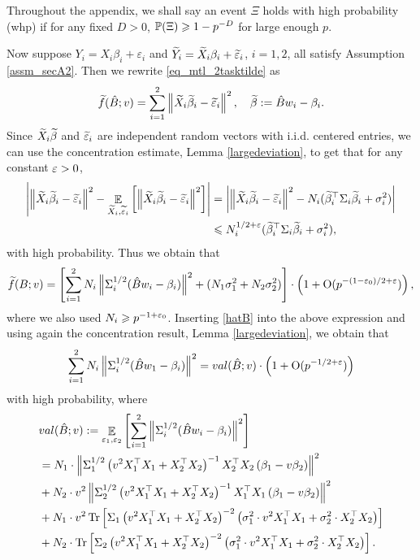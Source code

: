 Throughout the appendix, we shall say an event $\Xi$ holds with high probability (whp) if for any fixed $D>0$, $\P(\Xi)\ge 1- p^{-D}$ for large enough $p$.


Now suppose $Y_i = X_i\beta_i + \varepsilon_i$ and $\wt Y_i = \wt X_i\beta_i + \wt\varepsilon_i$, $i=1,2$, all satisfy Assumption \ref{assm_secA2}. Then we rewrite \eqref{eq_mtl_2tasktilde} as
$$	\wt f(\hat B; v) = \sum_{i=1}^2\left\| \wt X_i\wt\beta_i  - \wt \e_i\right\|^2 , \quad \wt\beta:=\hat B w_i-\beta_i.$$
Since $ \wt X_i\wt\beta$ and $ \wt \e_i$ are independent random vectors with i.i.d. centered entries, we can use the concentration estimate, Lemma \ref{largedeviation}, to get that for any constant $\e>0$,
\begin{align*}
\left|\left\| \wt X_i\wt\beta_i  - \wt \e_i\right\|^2 -  \exarg{\wt X_i,\wt{\e}_i} {\left\| \wt X_i\wt\beta_i  - \wt \e_i\right\|^2} \right| & =\left|\left\| \wt X_i\wt\beta_i  - \wt \e_i\right\|^2 - N_i (\wt\beta_i^\top \Sigma_i \wt\beta_i + \sigma_i^2) \right| \\
&\le N_i^{1/2+\e} (\wt\beta_i^\top \Sigma_i \wt\beta_i + \sigma_i^2),
\end{align*}
with high probability. Thus we obtain that 
$$\wt f(B; v)= \left[\sum_{i=1}^2 N_i\left\|\Sigma_i^{1/2}( \hat B w_i - \beta_i) \right\|^2 + (N_1\sigma^2_1+N_2\sigma^2_2)\right]\cdot \left( 1+\OO(p^{-(1-\e_0)/2+\e})\right),$$
where we also used $N_i\ge p^{-1+\e_0}$. Inserting \eqref{hatB} into the above expression and using 
 again the concentration result, Lemma \ref{largedeviation}, we obtain that
$$ \sum_{i=1}^2 N_i\left\|\Sigma_i^{1/2}( \hat B w_1 - \beta_i) \right\|^2 = \val(\hat B; v)\cdot \left( 1+\OO(p^{-1/2+\e})\right)$$
with high probability, where
\begin{align*}
		&\val(\hat{B}; v):= \exarg{\varepsilon_1,\e_2} {\sum_{i=1}^2 \left\|\Sigma_i^{1/2}( \hat B w_i - \beta_i) \right\|^2} \\
	&=  N_1 \cdot \bignorm{\Sigma_1^{1/2}\left(v^2 X_1^{\top}X_1 + X_2^{\top}X_2\right)^{-1}X_2^{\top}X_2\left (\beta_1 - v\beta_2\right)}^2 \nonumber \\
	&+ N_2 \cdot v^2\bignorm{\Sigma_2^{1/2}\left(v^2 X_1^{\top}X_1 + X_2^{\top}X_2\right)^{-1}X_1^{\top}X_1\left(\beta_1 - v\beta_2\right)}^2 \nonumber \\
		&+ N_1   \cdot v^2 \bigtr{\Sigma_1\left(v^2 X_1^{\top}X_1 + X_2^{\top}X_2\right)^{-2} \left(\sigma_1^2 \cdot v^2X_1^{\top}X_1 + \sigma_2^2 \cdot X_2^{\top}X_2\right)} \nonumber \\		
		&+ N_2  \cdot \bigtr{\Sigma_2\left(v^2 X_1^{\top}X_1 + X_2^{\top}X_2\right)^{-2} \left(\sigma_1^2 \cdot v^2  X_1^{\top}X_1 + \sigma_2^2  \cdot X_2^{\top}X_2\right)}. \label{eq_val_mtl}
\end{align*}
